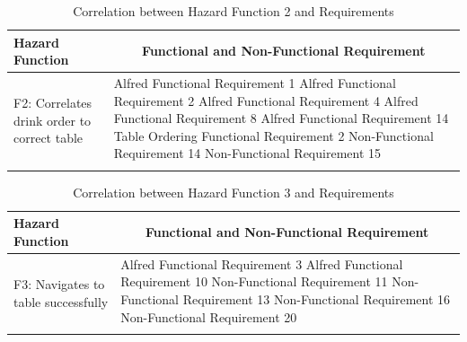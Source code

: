 \documentclass [10pt]{article}
\begin{document}
\begin{longtable}{| p{ } | p{ } |}
\hline 
\centering \textbf{Hazard Function} & 
\multicolumn{1}{c}{\textbf {Functional and Non-Functional Requirement}}\\ \hline
\multirow{6}{*}{F2: Correlates drink order to correct table} & 
		{Alfred Functional Requirement 1 \newline
		Alfred Functional Requirement 2 \newline
		Alfred Functional Requirement 4 \newline
		Alfred Functional Requirement 8 \newline
		Alfred Functional Requirement 14 \newline
		Table Ordering Functional Requirement 2 \newline
		Non-Functional Requirement 14 \newline
		Non-Functional Requirement 15} \\
\hline 
\caption{Correlation between Hazard Function 2 and Requirements}  
\end{longtable}



\begin{longtable}{| p{ } | p{ } |}
\hline 
\centering \textbf{Hazard Function} & 
\multicolumn{1}{c}{\textbf {Functional and Non-Functional Requirement}}\\ \hline
\multirow{5}{*}{F3: Navigates to table successfully} & 
		{Alfred Functional Requirement 3 \newline
		Alfred Functional Requirement 10 \newline
		Non-Functional Requirement 11 \newline
		Non-Functional Requirement 13 \newline
		Non-Functional Requirement 16 \newline
		Non-Functional Requirement 20} \\ 
\hline 
\caption{Correlation between Hazard Function 3 and Requirements}  
\end{longtable}

\end{document}

